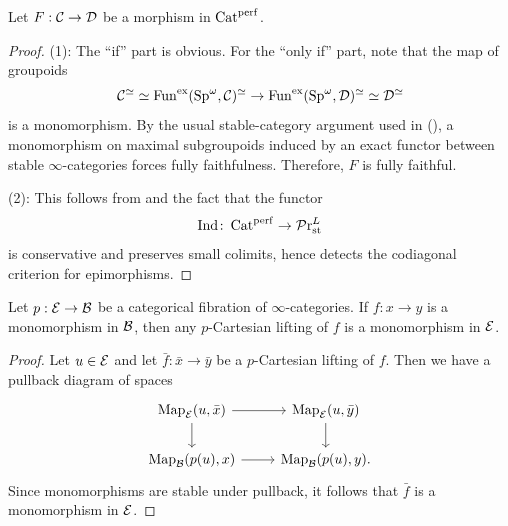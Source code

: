 \documentclass[10pt,a4paper,oneside]{article}
\begin{document}
\begin{ex}\label{monoepicatperf}
Let $F:\mathcal{C}\to \mathcal{D}$ be a morphism in $\operatorname{Cat}^{\operatorname{perf}}$.
\end{ex}
\begin{proof}
(1): The ``if'' part is obvious. For the ``only if'' part, note that the map of groupoids
\[
\mathcal{C}^{\simeq} \simeq \operatorname{Fun}^{\operatorname{ex}}(\mathrm{Sp}^\omega, \mathcal{C})^{\simeq} \rightarrow \operatorname{Fun}^{\operatorname{ex}}(\mathrm{Sp}^\omega, \mathcal{D})^{\simeq} \simeq \mathcal{D}^{\simeq}
\]
is a monomorphism. By the usual stable-category argument used in \cite[Proposition A.1(1)]{efimov2024k} (\cf \cite[Lemma~7.5]{hattt}), a monomorphism on maximal subgroupoids induced by an exact functor between stable $\infty$-categories forces fully faithfulness. Therefore, $F$ is fully faithful.

(2): This follows from \cite[Proposition A.1(2)]{efimov2024k} and the fact that the functor $$\operatorname{Ind}\colon\operatorname{Cat}^{\operatorname{perf}}\rightarrow\mathcal{P}\mathrm{r}_{\operatorname{st}}^L$$ is conservative and preserves small colimits, hence detects the codiagonal criterion for epimorphisms.
\end{proof}

\begin{lem}\label{cartmono}
Let $p:\mathcal{E}\to\mathcal{B}$ be a categorical fibration of $\infty$-categories. If $f:x\to y$ is a monomorphism in $\mathcal{B}$, then any $p$-Cartesian lifting of $f$ is a monomorphism in $\mathcal{E}$.
\end{lem}
\begin{proof}
Let $u\in\mathcal{E}$ and let $\bar{f}:\bar{x}\to\bar{y}$ be a $p$-Cartesian lifting of $f$. Then we have a pullback diagram of spaces 
\[
\begin{tikzcd}
{\mapp_{\mc{E}}(u,\bar{x})} \arrow[d] \arrow[r] & {\mapp_{\mc{E}}(u,\bar{y})} \arrow[d] \\
{\mapp_{\mc{B}}(p(u),x)} \arrow[r]              & {\mapp_{\mc{B}}(p(u),y)}.           
\end{tikzcd}
\]
Since monomorphisms are stable under pullback, it follows that $\bar{f}$ is a monomorphism in $\mathcal{E}$.
\end{proof}
\end{document}
